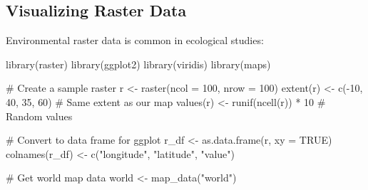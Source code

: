 \documentclass[
  letterpaper,
]{book}
\newenvironment{Shaded}{\begin{snugshade}}{\end{snugshade}}
\newcommand{\AttributeTok}[1]{\textcolor[rgb]{0.40,0.45,0.13}{#1}}
\newcommand{\CommentTok}[1]{\textcolor[rgb]{0.37,0.37,0.37}{#1}}
\newcommand{\ConstantTok}[1]{\textcolor[rgb]{0.56,0.35,0.01}{#1}}
\newcommand{\DecValTok}[1]{\textcolor[rgb]{0.68,0.00,0.00}{#1}}
\newcommand{\FunctionTok}[1]{\textcolor[rgb]{0.28,0.35,0.67}{#1}}
\newcommand{\NormalTok}[1]{\textcolor[rgb]{0.00,0.23,0.31}{#1}}
\newcommand{\OtherTok}[1]{\textcolor[rgb]{0.00,0.23,0.31}{#1}}
\newcommand{\SpecialCharTok}[1]{\textcolor[rgb]{0.37,0.37,0.37}{#1}}
\newcommand{\StringTok}[1]{\textcolor[rgb]{0.13,0.47,0.30}{#1}}
\begin{document}
\subsection{Visualizing Raster Data}\label{visualizing-raster-data}

Environmental raster data is common in ecological studies:

\begin{Shaded}
\begin{Highlighting}[]
\FunctionTok{library}\NormalTok{(raster)}
\FunctionTok{library}\NormalTok{(ggplot2)}
\FunctionTok{library}\NormalTok{(viridis)}
\FunctionTok{library}\NormalTok{(maps)}

\CommentTok{\# Create a sample raster}
\NormalTok{r }\OtherTok{\textless{}{-}} \FunctionTok{raster}\NormalTok{(}\AttributeTok{ncol =} \DecValTok{100}\NormalTok{, }\AttributeTok{nrow =} \DecValTok{100}\NormalTok{)}
\FunctionTok{extent}\NormalTok{(r) }\OtherTok{\textless{}{-}} \FunctionTok{c}\NormalTok{(}\SpecialCharTok{{-}}\DecValTok{10}\NormalTok{, }\DecValTok{40}\NormalTok{, }\DecValTok{35}\NormalTok{, }\DecValTok{60}\NormalTok{)  }\CommentTok{\# Same extent as our map}
\FunctionTok{values}\NormalTok{(r) }\OtherTok{\textless{}{-}} \FunctionTok{runif}\NormalTok{(}\FunctionTok{ncell}\NormalTok{(r)) }\SpecialCharTok{*} \DecValTok{10}  \CommentTok{\# Random values}

\CommentTok{\# Convert to data frame for ggplot}
\NormalTok{r\_df }\OtherTok{\textless{}{-}} \FunctionTok{as.data.frame}\NormalTok{(r, }\AttributeTok{xy =} \ConstantTok{TRUE}\NormalTok{)}
\FunctionTok{colnames}\NormalTok{(r\_df) }\OtherTok{\textless{}{-}} \FunctionTok{c}\NormalTok{(}\StringTok{"longitude"}\NormalTok{, }\StringTok{"latitude"}\NormalTok{, }\StringTok{"value"}\NormalTok{)}

\CommentTok{\# Get world map data}
\NormalTok{world }\OtherTok{\textless{}{-}} \FunctionTok{map\_data}\NormalTok{(}\StringTok{"world"}\NormalTok{)}


\end{Highlighting}
\end{Shaded}
\end{document}
